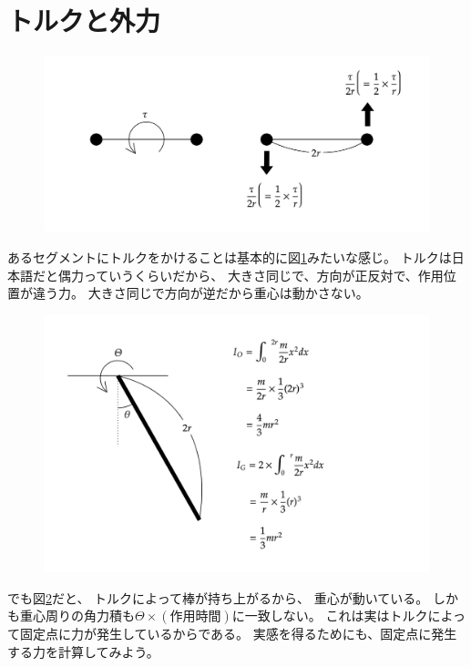 \documentclass[a4paper,11pt]{jsarticle}
\begin{document}
\section{トルクと外力}
\begin{figure}[b]
  \centering
  \includegraphics[width = 1\textwidth]{Torque_Force.png}
  \caption{}
  \label{fig:Torque_Force}
\end{figure}
あるセグメントにトルクをかけることは基本的に図\ref{fig:Torque_Force}みたいな感じ。
トルクは日本語だと偶力っていうくらいだから、
大きさ同じで、方向が正反対で、作用位置が違う力。
大きさ同じで方向が逆だから重心は動かさない。

\begin{figure}[t]
  \centering
  \includegraphics[width = 1\textwidth]{Single_Stick.png}
  \caption{}
  \label{fig:Single_Stick}
\end{figure}
でも図\ref{fig:Single_Stick}だと、
トルクによって棒が持ち上がるから、
重心が動いている。
しかも重心周りの角力積も$\Theta\times (作用時間)$に一致しない。
これは実はトルクによって固定点に力が発生しているからである。
実感を得るためにも、固定点に発生する力を計算してみよう。
\end{document}

